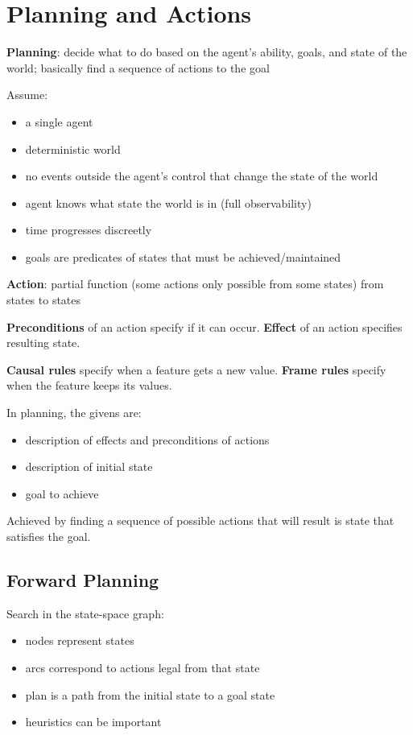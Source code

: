 \documentclass[11pt]{article}
\begin{document}
\section{Planning and Actions}
\label{sec:orgc820c68}
\textbf{Planning}: decide what to do based on the agent's ability, goals, and state of the world; basically find
a sequence of actions to the goal

Assume:
\begin{itemize}
\item a single agent
\item deterministic world
\item no events outside the agent's control that change the state of the world
\item agent knows what state the world is in (full observability)
\item time progresses discreetly
\item goals are predicates of states that must be achieved/maintained
\end{itemize}

\textbf{Action}: partial function (some actions only possible from some states) from states to states

\textbf{Preconditions} of an action specify if it can occur. \textbf{Effect} of an action specifies resulting state.

\textbf{Causal rules} specify when a feature gets a new value. \textbf{Frame rules} specify when the feature keeps
its values.

In planning, the givens are:
\begin{itemize}
\item description of effects and preconditions of actions
\item description of initial state
\item goal to achieve
\end{itemize}

Achieved by finding a sequence of possible actions that will result is state that satisfies the goal.
\subsection{Forward Planning}
\label{sec:org25c200a}
Search in the state-space graph:
\begin{itemize}
\item nodes represent states
\item arcs correspond to actions legal from that state
\item plan is a path from the initial state to a goal state
\item heuristics can be important
\end{itemize}
\end{document}
